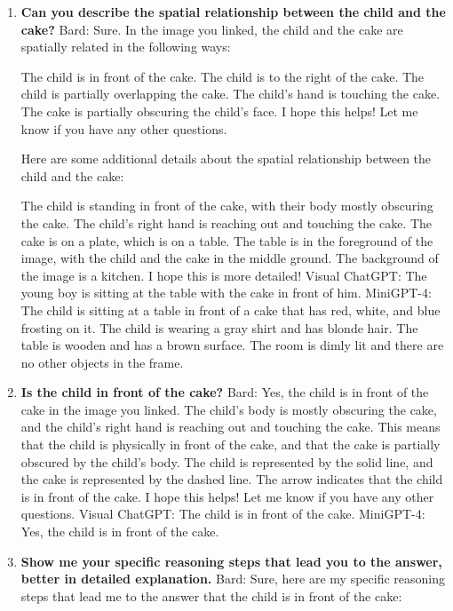     \begin{enumerate}
        \item \textbf{Can you describe the spatial relationship between the child and the cake?}
        \subitem Bard: 
        Sure. In the image you linked, the child and the cake are spatially related in the following ways:
        
        The child is in front of the cake.
        The child is to the right of the cake.
        The child is partially overlapping the cake.
        The child's hand is touching the cake.
        The cake is partially obscuring the child's face.
        I hope this helps! Let me know if you have any other questions.
        
        Here are some additional details about the spatial relationship between the child and the cake:
        
        The child is standing in front of the cake, with their body mostly obscuring the cake.
        The child's right hand is reaching out and touching the cake.
        The cake is on a plate, which is on a table.
        The table is in the foreground of the image, with the child and the cake in the middle ground.
        The background of the image is a kitchen.
        I hope this is more detailed!
        \subitem Visual ChatGPT: The young boy is sitting at the table with the cake in front of him.
        \subitem MiniGPT-4: The child is sitting at a table in front of a cake that has red, white, and blue frosting on it. The child is wearing a gray shirt and has blonde hair. The table is wooden and has a brown surface. The room is dimly lit and there are no other objects in the frame.
        \item \textbf{Is the child in front of the cake?}
        \subitem Bard: 
        Yes, the child is in front of the cake in the image you linked. The child's body is mostly obscuring the cake, and the child's right hand is reaching out and touching the cake. This means that the child is physically in front of the cake, and that the cake is partially obscured by the child's body.
        The child is represented by the solid line, and the cake is represented by the dashed line. The arrow indicates that the child is in front of the cake.
        I hope this helps! Let me know if you have any other questions.
        \subitem Visual ChatGPT: The child is in front of the cake.
        \subitem MiniGPT-4: Yes, the child is in front of the cake.
        \item \textbf{Show me your specific reasoning steps that lead you to the answer, better in detailed explanation.}
        \subitem Bard:
        Sure, here are my specific reasoning steps that lead me to the answer that the child is in front of the cake:


\end{enumerate}
